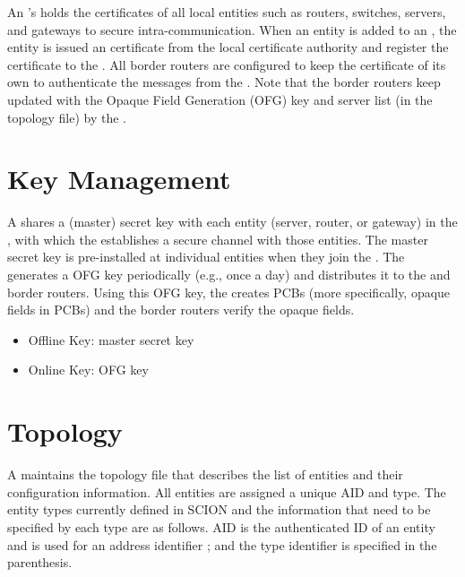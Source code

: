  An \AD's \CS holds the certificates of all local entities such as routers, switches, servers, and gateways to secure intra-\AD communication. When an entity is added to an \AD, the entity is issued an certificate from the local certificate authority and register the certificate to the \CS. All border routers are configured to keep the \CS certificate of its own \AD to authenticate the messages from the \CS. Note that the border routers keep updated with the Opaque Field Generation (OFG) key and server list (in the topology file) by the \CS.


\section{Key Management}
A \CS shares a (master) secret key with each entity (server, router, or gateway) in the \AD, with which the \CS establishes a secure channel with those entities. The master secret key is pre-installed at individual entities when they join the \AD{}. The \CS generates a OFG key periodically (e.g., once a day) and distributes it to the \BS and border routers. Using this OFG key, the \BS creates PCBs (more specifically, opaque fields in PCBs) and the border routers verify the opaque fields. 

\begin{itemize}
\item {Offline Key: } master secret key
\item {Online Key: } OFG key
\end{itemize}



\section{Topology}
A \CS maintains the \AD topology file that describes the list of entities and their configuration information.
All entities are assigned a unique AID and type. The entity types currently defined in SCION and the information that need to be specified by each type are as follows.
AID is the authenticated ID of an entity and is used for an address identifier ; and the type identifier is specified in the parenthesis.

